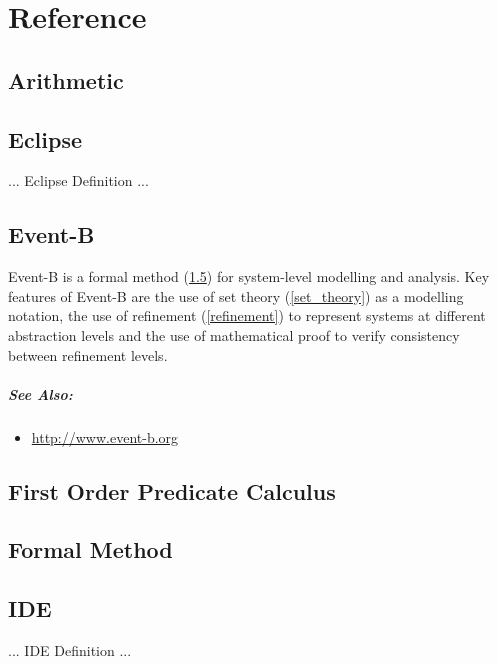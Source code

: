 \chapter{Reference}

\section{Arithmetic}
\label{arithmetic}

\section{Eclipse}
\label{eclipse}

... Eclipse Definition ...

\section{Event-B}
\label{event-b}

Event-B is a formal method (\ref{formal_method}) for system-level modelling and analysis. Key features of Event-B are the use of set theory (\ref{set_theory}) as a modelling notation, the use of refinement (\ref{refinement}) to represent systems at different abstraction levels and the use of mathematical proof to verify consistency between refinement levels.

\paragraph{See Also:}
\begin{itemize}
\item \url{http://www.event-b.org}
\end{itemize}

\section{First Order Predicate Calculus}
\label{first_order_predicate_calculus}


\section{Formal Method}
\label{formal_method}

\section{IDE}
\label{ide}

... IDE Definition ...

